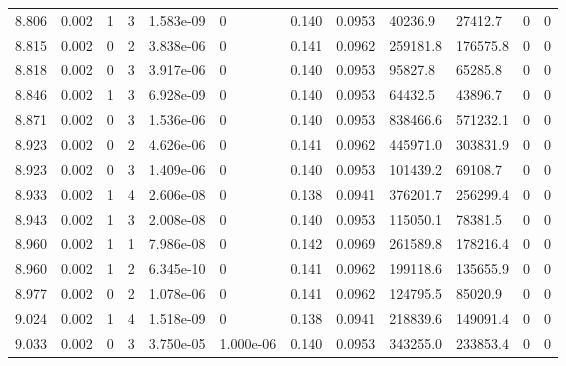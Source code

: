\documentclass[preview]{standalone}
\begin{document}
{{{{{{{{{{{{\begin{tabular}{L{1.2cm}C{1.2cm} C{0.3cm}C{0.5cm} C{1.4cm}C{1.4cm} C{1.4cm}C{1.4cm} C{1.6cm}C{1.6cm} C{1.6cm}C{1.6cm}}
  8.806  &  0.002  & 1     &  3 &  1.583e-09  & 0  &  0.140&   0.0953& 40236.9 & 27412.7   &  0 & 0  \\ 
  8.815  &  0.002  & 0     &  2 &  3.838e-06  & 0  &  0.141&   0.0962& 259181.8 & 176575.8   &  0 & 0  \\ 
  8.818  &  0.002  & 0     &  3 &  3.917e-06  & 0  &  0.140&   0.0953& 95827.8 & 65285.8   &  0 & 0  \\ 
  8.846  &  0.002  & 1     &  3 &  6.928e-09  & 0  &  0.140&   0.0953& 64432.5 & 43896.7   &  0 & 0  \\ 
  8.871  &  0.002  & 0     &  3 &  1.536e-06  & 0  &  0.140&   0.0953& 838466.6 & 571232.1   &  0 & 0  \\ 
  8.923  &  0.002  & 0     &  2 &  4.626e-06  & 0  &  0.141&   0.0962& 445971.0 & 303831.9   &  0 & 0  \\ 
  8.923  &  0.002  & 0     &  3 &  1.409e-06  & 0  &  0.140&   0.0953& 101439.2 & 69108.7   &  0 & 0  \\ 
  8.933  &  0.002  & 1     &  4 &  2.606e-08  & 0  &  0.138&   0.0941& 376201.7 & 256299.4   &  0 & 0  \\ 
  8.943  &  0.002  & 1     &  3 &  2.008e-08  & 0  &  0.140&   0.0953& 115050.1 & 78381.5   &  0 & 0  \\ 
  8.960  &  0.002  & 1     &  1 &  7.986e-08  & 0  &  0.142&   0.0969& 261589.8 & 178216.4   &  0 & 0  \\ 
  8.960  &  0.002  & 1     &  2 &  6.345e-10  & 0  &  0.141&   0.0962& 199118.6 & 135655.9   &  0 & 0  \\ 
  8.977  &  0.002  & 0     &  2 &  1.078e-06  & 0  &  0.141&   0.0962& 124795.5 & 85020.9   &  0 & 0  \\ 
  9.024  &  0.002  & 1     &  4 &  1.518e-09  & 0  &  0.138&   0.0941& 218839.6 & 149091.4   &  0 & 0  \\ 
  9.033  &  0.002  & 0     &  3 &  3.750e-05  & 1.000e-06  &  0.140&   0.0953& 343255.0 & 233853.4   &  0 & 0  \\ 
\hline 
\end{tabular} 

}}}}}}}}}}}}
\end{document}
